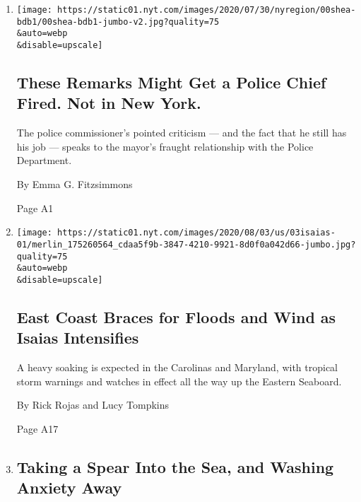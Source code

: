 \begin{enumerate}
\def\labelenumi{\arabic{enumi}.}
\item
  \href{/2020/08/03/nyregion/police-shea-de-blasio-nyc.html}{}

  \texttt{[image: https://static01.nyt.com/images/2020/07/30/nyregion/00shea-bdb1/00shea-bdb1-jumbo-v2.jpg?quality=75\\\&auto=webp\\\&disable=upscale]}

  \hypertarget{these-remarks-might-get-a-police-chief-fired-not-in-new-york}{%
  \subsection{These Remarks Might Get a Police Chief Fired. Not in New
  York.}\label{these-remarks-might-get-a-police-chief-fired-not-in-new-york}}

  The police commissioner's pointed criticism --- and the fact that he
  still has his job --- speaks to the mayor's fraught relationship with
  the Police Department.

  By Emma G. Fitzsimmons

  Page A1
\item
  \href{/2020/08/03/us/isaias-east-coast-landfall.html}{}

  \texttt{[image: https://static01.nyt.com/images/2020/08/03/us/03isaias-01/merlin\_175260564\_cdaa5f9b-3847-4210-9921-8d0f0a042d66-jumbo.jpg?quality=75\\\&auto=webp\\\&disable=upscale]}

  \hypertarget{east-coast-braces-for-floods-and-wind-as-isaias-intensifies}{%
  \subsection{East Coast Braces for Floods and Wind as Isaias
  Intensifies}\label{east-coast-braces-for-floods-and-wind-as-isaias-intensifies}}

  A heavy soaking is expected in the Carolinas and Maryland, with
  tropical storm warnings and watches in effect all the way up the
  Eastern Seaboard.

  By Rick Rojas and Lucy Tompkins

  Page A17
\item
  \href{/2020/08/03/world/australia/spearfishing-sydney-coronavirus.html}{}

  \hypertarget{taking-a-spear-into-the-sea-and-washing-anxiety-away}{%
  \subsection{Taking a Spear Into the Sea, and Washing Anxiety
  Away}\label{taking-a-spear-into-the-sea-and-washing-anxiety-away}}


\end{enumerate}
